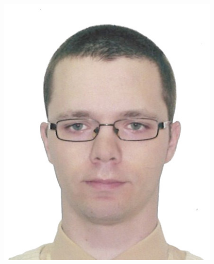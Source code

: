 \documentclass[10pt,A4]{article}
\begin{document}
\pagestyle{fancy}


\vspace{-20.55pt}


\hspace{-0.25\linewidth}\colorbox{bgcol}{}



\begin{figure}[H]
	\begin{flushright}
		\includegraphics[width=0.15\linewidth]{myfoto.jpg}	%
	\end{flushright}
\end{figure}


\end{document}
